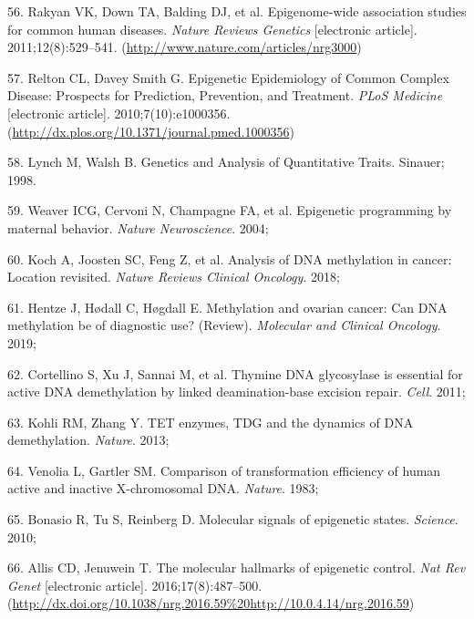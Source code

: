 \documentclass[11pt,oneside]{bristolthesis}
\newenvironment{cslreferences}%
  {}%
  {\par}
\begin{document}
\begin{cslreferences}
\leavevmode\hypertarget{ref-Rakyan2011}{}%
56. Rakyan VK, Down TA, Balding DJ, et al. Epigenome-wide association studies for common human diseases. \emph{Nature Reviews Genetics} {[}electronic article{]}. 2011;12(8):529--541. (\url{http://www.nature.com/articles/nrg3000})

\leavevmode\hypertarget{ref-Relton2010}{}%
57. Relton CL, Davey Smith G. Epigenetic Epidemiology of Common Complex Disease: Prospects for Prediction, Prevention, and Treatment. \emph{PLoS Medicine} {[}electronic article{]}. 2010;7(10):e1000356. (\url{http://dx.plos.org/10.1371/journal.pmed.1000356})

\leavevmode\hypertarget{ref-Lynch1998}{}%
58. Lynch M, Walsh B. Genetics and Analysis of Quantitative Traits. Sinauer; 1998.

\leavevmode\hypertarget{ref-Weaver2004}{}%
59. Weaver ICG, Cervoni N, Champagne FA, et al. Epigenetic programming by maternal behavior. \emph{Nature Neuroscience}. 2004;

\leavevmode\hypertarget{ref-Koch2018}{}%
60. Koch A, Joosten SC, Feng Z, et al. Analysis of DNA methylation in cancer: Location revisited. \emph{Nature Reviews Clinical Oncology}. 2018;

\leavevmode\hypertarget{ref-Hentze2019}{}%
61. Hentze J, Hødall C, Høgdall E. Methylation and ovarian cancer: Can DNA methylation be of diagnostic use? (Review). \emph{Molecular and Clinical Oncology}. 2019;

\leavevmode\hypertarget{ref-Cortellino2011}{}%
62. Cortellino S, Xu J, Sannai M, et al. Thymine DNA glycosylase is essential for active DNA demethylation by linked deamination-base excision repair. \emph{Cell}. 2011;

\leavevmode\hypertarget{ref-Kohli2013}{}%
63. Kohli RM, Zhang Y. TET enzymes, TDG and the dynamics of DNA demethylation. \emph{Nature}. 2013;

\leavevmode\hypertarget{ref-Venolia1983}{}%
64. Venolia L, Gartler SM. Comparison of transformation efficiency of human active and inactive X-chromosomal DNA. \emph{Nature}. 1983;

\leavevmode\hypertarget{ref-Bonasio2010}{}%
65. Bonasio R, Tu S, Reinberg D. Molecular signals of epigenetic states. \emph{Science}. 2010;

\leavevmode\hypertarget{ref-Allis2016}{}%
66. Allis CD, Jenuwein T. The molecular hallmarks of epigenetic control. \emph{Nat Rev Genet} {[}electronic article{]}. 2016;17(8):487--500. (\url{http://dx.doi.org/10.1038/nrg.2016.59\%20http://10.0.4.14/nrg.2016.59})


\end{cslreferences}
\end{document}
